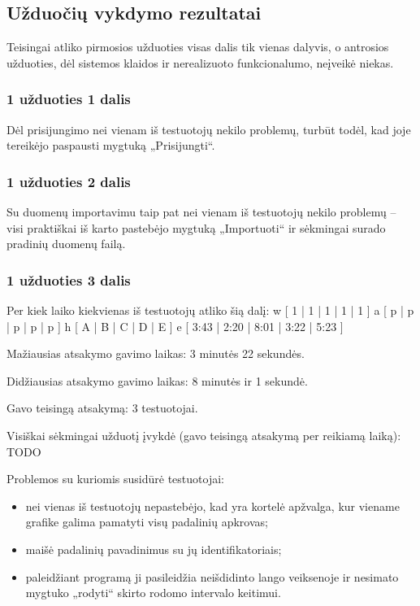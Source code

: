 \subsection{Užduočių vykdymo rezultatai}

Teisingai atliko pirmosios užduoties visas dalis tik vienas dalyvis,
o antrosios užduoties, dėl sistemos klaidos ir nerealizuoto
funkcionalumo, neįveikė niekas.

\subsubsection{1 užduoties 1 dalis}

Dėl prisijungimo nei vienam iš testuotojų nekilo problemų, turbūt todėl,
kad joje tereikėjo paspausti mygtuką „Prisijungti“.

\subsubsection{1 užduoties 2 dalis}

Su duomenų importavimu taip pat nei vienam iš testuotojų nekilo problemų
– visi praktiškai iš karto pastebėjo mygtuką „Importuoti“ ir sėkmingai
surado pradinių duomenų failą.

\subsubsection{1 užduoties 3 dalis}

Per kiek laiko kiekvienas iš testuotojų atliko šią dalį:
\xtable
{
  w [ 1 | 1 | 1 | 1 | 1 ]
  a [ p | p | p | p | p ]
  h [ A | B | C | D | E ]
  e [ 3:43 | 2:20 | 8:01 | 3:22 | 5:23 ]
}

Mažiausias atsakymo gavimo laikas: 3 minutės 22 sekundės.

Didžiausias atsakymo gavimo laikas: 8 minutės ir 1 sekundė.

Gavo teisingą atsakymą: 3 testuotojai.

Visiškai sėkmingai užduotį įvykdė (gavo teisingą atsakymą per reikiamą 
laiką): TODO

Problemos su kuriomis susidūrė testuotojai:
\begin{itemize}
  \item nei vienas iš testuotojų nepastebėjo, kad yra kortelė apžvalga,
    kur viename grafike galima pamatyti visų padalinių apkrovas;
  \item maišė padalinių pavadinimus su jų identifikatoriais;
  \item paleidžiant programą ji pasileidžia neišdidinto lango veiksenoje
    ir nesimato mygtuko „rodyti“ skirto rodomo intervalo keitimui.
\end{itemize}

